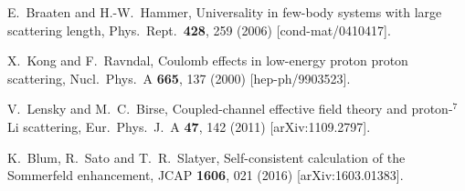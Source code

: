 \documentclass[%
 reprint,
 amsmath,amssymb,
 aps,
]{revtex4-1}
\begin{document}
\begin{thebibliography}{99}
  E.~Braaten and H.-W.~Hammer,
 Universality in few-body systems with large scattering length,
  Phys.\ Rept.\  {\bf 428}, 259 (2006)
  [cond-mat/0410417].


  X.~Kong and F.~Ravndal,
 Coulomb effects in low-energy proton proton scattering,
  Nucl.\ Phys.\ A {\bf 665}, 137 (2000)
  [hep-ph/9903523].


  V.~Lensky and M.~C.~Birse,
 Coupled-channel effective field theory and proton-$^7$Li scattering,
  Eur.\ Phys.\ J.\ A {\bf 47}, 142 (2011)
  [arXiv:1109.2797].


  K.~Blum, R.~Sato and T.~R.~Slatyer,
 Self-consistent calculation of the Sommerfeld enhancement,
  JCAP {\bf 1606}, 021 (2016)
  [arXiv:1603.01383].




\end{thebibliography}
\end{document}

